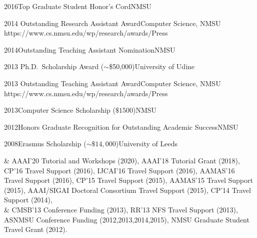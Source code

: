 \begin{awards}
\awardentryN
{2016}{Top Graduate Student Honor's Cord}{NMSU}

\awardentry
	{2014}
	{Outstanding Research Assistant Award}{Computer Science, NMSU}
	{https://www.cs.nmsu.edu/wp/research/awards/}{Press}

\awardentryN
	{2014}{Outstanding Teaching Assistant Nomination}{NMSU}

\awardentryN
	{2013}
	{Ph.D.~Scholarship Award ($\sim$\$50,000)}{University of Udine}

\awardentry 
   {2013}
   {Outstanding Teaching Assistant Award}{Computer Science, NMSU}
   {https://www.cs.nmsu.edu/wp/research/awards/}{Press}

\awardentryN
{2013}{Computer Science Scholarship ($\$ 1500$)}{NMSU}

\awardentryN
{2012}{Honors Graduate Recognition for Outstanding Academic Success}{NMSU}

\awardentryN
{2008}{Erasmus Scholarship ($\sim \$ 14,000$)}{University of Leeds}

\end{awards}

\begin{awards}
&	AAAI'20 Tutorial and Workshops (2020), 
	AAAI'18 Tutorial Grant (2018), 
	CP'16 Travel Support (2016), 
	IJCAI'16 Travel Support (2016), 
	AAMAS'16 Travel Support (2016), 
	CP'15 Travel Support (2015), 
	AAMAS'15 Travel Support (2015), 
	AAAI/SIGAI Doctoral Consortium Travel Support (2015), 
  	CP'14 Travel Support (2014),\\
&  	CMSB'13 Conference Funding (2013), 
  	RR'13 NFS Travel Support (2013), 
  	ASNMSU Conference Funding (2012,2013,2014,2015), 
  	NMSU Graduate Student Travel Grant  (2012).
\end{awards}
